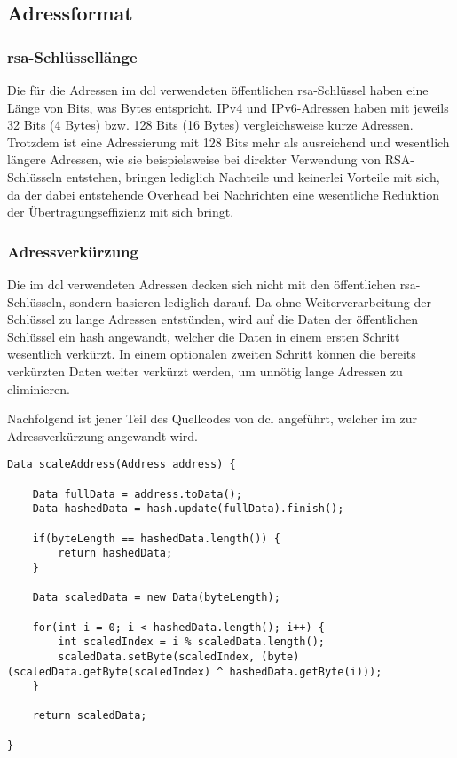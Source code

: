 \subsection{Adressformat}

\subsubsection{\gls*{rsa}-Schlüssellänge}
Die für die Adressen im \gls{dcl} verwendeten öffentlichen \gls{rsa}-Schlüssel haben eine Länge von \addrkeybits
Bits, was \addrkeybytes Bytes entspricht.
IPv4 und IPv6-Adressen haben mit jeweils 32 Bits (4 Bytes) bzw. 128 Bits (16 Bytes) vergleichsweise kurze
Adressen. Trotzdem ist eine Adressierung mit 128 Bits mehr als ausreichend und wesentlich längere
Adressen, wie sie beispielsweise bei direkter Verwendung von RSA-Schlüsseln entstehen, bringen
lediglich Nachteile und keinerlei Vorteile mit sich, da der dabei entstehende Overhead bei Nachrichten
eine wesentliche Reduktion der Übertragungseffizienz mit sich bringt.

\subsubsection{Adressverkürzung}
\label{dcl-addr-scaling}
Die im \gls{dcl} verwendeten Adressen decken sich nicht mit den öffentlichen \gls{rsa}-Schlüsseln,
sondern basieren lediglich darauf. Da ohne Weiterverarbeitung der Schlüssel zu lange Adressen entstünden,
wird auf die Daten der öffentlichen Schlüssel ein \gls{hash} angewandt, welcher die Daten in einem ersten
Schritt wesentlich verkürzt. In einem optionalen zweiten Schritt können die bereits verkürzten
Daten weiter verkürzt werden, um unnötig lange Adressen zu eliminieren.

Nachfolgend ist jener Teil des Quellcodes von \gls{dcl} angeführt, welcher im 
zur Adressverkürzung angewandt wird.

\label{dcl-addr-scaling-cnet}
\javalisting
\begin{lstlisting}[caption={Adressverkürzung im \gls*{cnt} (Java)},captionpos=b]
Data scaleAddress(Address address) {

	Data fullData = address.toData();
	Data hashedData = hash.update(fullData).finish();

	if(byteLength == hashedData.length()) {
		return hashedData;
	}

	Data scaledData = new Data(byteLength);

	for(int i = 0; i < hashedData.length(); i++) {
		int scaledIndex = i % scaledData.length();
		scaledData.setByte(scaledIndex, (byte)(scaledData.getByte(scaledIndex) ^ hashedData.getByte(i)));
	}

	return scaledData;

}
\end{lstlisting}

